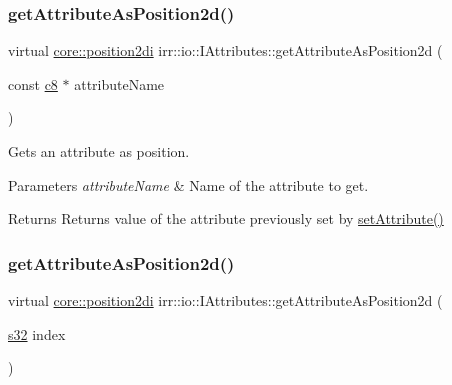 \subsubsection{\texorpdfstring{get\+Attribute\+As\+Position2d()}{getAttributeAsPosition2d()}\hspace{0.1cm}{\footnotesize\ttfamily [1/2]}}
{\footnotesize\ttfamily virtual \hyperlink{namespaceirr_1_1core_a3643c2cc7820dd78cd87e73a46b92145}{core\+::position2di} irr\+::io\+::\+I\+Attributes\+::get\+Attribute\+As\+Position2d (\begin{DoxyParamCaption}\item[{const \hyperlink{namespaceirr_a9395eaea339bcb546b319e9c96bf7410}{c8} $\ast$}]{attribute\+Name }\end{DoxyParamCaption})\hspace{0.3cm}{\ttfamily [pure virtual]}}



Gets an attribute as position. 


\begin{DoxyParams}{Parameters}
{\em attribute\+Name} & Name of the attribute to get. \\
\hline
\end{DoxyParams}
\begin{DoxyReturn}{Returns}
Returns value of the attribute previously set by \hyperlink{classirr_1_1io_1_1IAttributes_a03fa31acb481ae23678676cc183f09a6}{set\+Attribute()} 
\end{DoxyReturn}
\mbox{\label{classirr_1_1io_1_1IAttributes_a11afd9cf70fb04706e26ef15a3423d9a}} 
\subsubsection{\texorpdfstring{get\+Attribute\+As\+Position2d()}{getAttributeAsPosition2d()}\hspace{0.1cm}{\footnotesize\ttfamily [2/2]}}
{\footnotesize\ttfamily virtual \hyperlink{namespaceirr_1_1core_a3643c2cc7820dd78cd87e73a46b92145}{core\+::position2di} irr\+::io\+::\+I\+Attributes\+::get\+Attribute\+As\+Position2d (\begin{DoxyParamCaption}\item[{\hyperlink{namespaceirr_ac66849b7a6ed16e30ebede579f9b47c6}{s32}}]{index }\end{DoxyParamCaption})\hspace{0.3cm}{\ttfamily [pure virtual]}}



